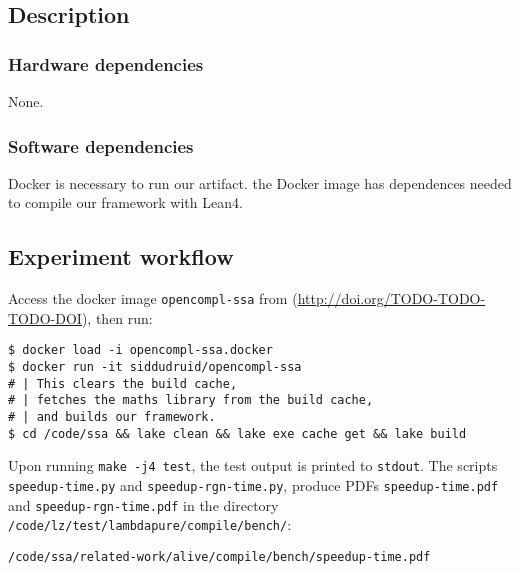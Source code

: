 \documentclass{sigplanconf}
\begin{document}
\subsection{Description}

\subsubsection{Hardware dependencies}

None.

\subsubsection{Software dependencies}

Docker is necessary to run our artifact. the Docker image has dependences needed to compile our framework with Lean4.



\subsection{Experiment workflow}

Access the docker image \texttt{opencompl-ssa} from
(\url{http://doi.org/TODO-TODO-TODO-DOI}), then run:

\begin{verbatim}
$ docker load -i opencompl-ssa.docker
$ docker run -it siddudruid/opencompl-ssa
# | This clears the build cache,
# | fetches the maths library from the build cache,
# | and builds our framework.
$ cd /code/ssa && lake clean && lake exe cache get && lake build
\end{verbatim}


Upon running \texttt{make -j4 test}, the test output is printed to \texttt{stdout}.
The scripts \texttt{speedup-time.py} and \texttt{speedup-rgn-time.py},
produce PDFs \texttt{speedup-time.pdf} and \texttt{speedup-rgn-time.pdf}
in the directory \texttt{/code/lz/test/lambdapure/compile/bench/}:

\begin{verbatim}
/code/ssa/related-work/alive/compile/bench/speedup-time.pdf
\end{verbatim}
\end{document}
